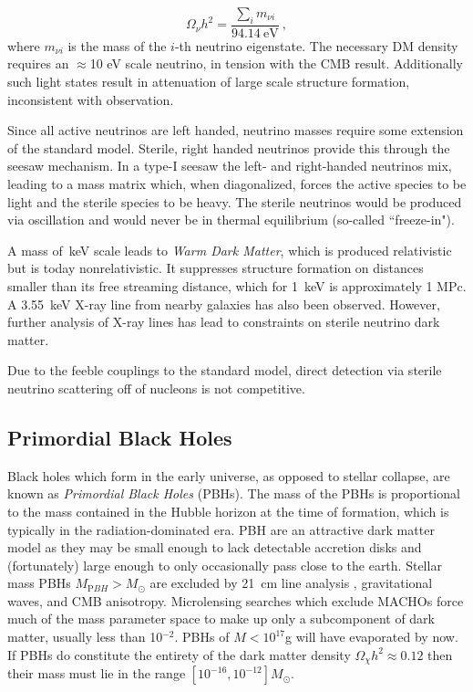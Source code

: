 \begin{equation}
    \Omega_\nu h^2 = \frac{\sum_i m_{\nu i}}{94.14 \mathrm{~eV}}~,
\end{equation}
\noindent
where $m_{\nu i}$ is the mass of the $i$-th neutrino eigenstate.
The necessary DM density requires an $\approx$10 eV scale neutrino, in tension with the CMB result\cite{planck_collaboration_planck_2020}.
Additionally such light states result in attenuation of large scale structure formation, inconsistent with observation.

Since all active neutrinos are left handed, neutrino masses require some extension of the standard model.
Sterile, right handed neutrinos provide this through the seesaw mechanism\cite{boyarsky_sterile_2019}.
In a type-I seesaw the left- and right-handed neutrinos mix, leading to a mass matrix which, when diagonalized, forces the active species to be light and the sterile species to be heavy.
The sterile neutrinos would be produced via oscillation and would never be in thermal equilibrium (so-called ``freeze-in").

A mass of~keV scale leads to \textit{Warm Dark Matter}, which is produced relativistic but is today nonrelativistic.
It suppresses structure formation on distances smaller than its free streaming distance, which for 1~keV is approximately 1 MPc.
A 3.55~keV X-ray line from nearby galaxies has also been observed\cite{bulbul_detection_2014}.
However, further analysis of X-ray lines has lead to constraints on sterile neutrino dark matter\cite{dasgupta_sterile_2021}.

Due to the feeble couplings to the standard model, direct detection via sterile neutrino scattering off of nucleons is not competitive.

\subsection{Primordial Black Holes}

Black holes which form in the early universe, as opposed to stellar collapse, are known as \textit{Primordial Black Holes} (PBHs).
The mass of the PBHs is proportional to the mass contained in the Hubble horizon at the time of formation\cite{villanueva-domingo_brief_2021}, which is typically in the radiation-dominated era.
PBH are an attractive dark matter model as they may be small enough to lack detectable accretion disks and (fortunately) large enough to only occasionally pass close to the earth.
Stellar mass PBHs $M_{ \mathrm PBH} > M_\odot$ are excluded by 21~cm line analysis \cite{villanueva-domingo_21_2021}, gravitational waves, and CMB anisotropy.
Microlensing searches which exclude MACHOs\cite{hawkins_new_2015} force much of the mass parameter space to make up only a subcomponent of dark matter, usually less than 10$^{-2}$.
PBHs of $M<10^{17}$g will have evaporated by now.
If PBHs do constitute the entirety of the dark matter density $\Omega_\chi h^2\approx 0.12$ then their mass must lie in the range $[10^{-16}, 10^{-12}]M_\odot$\cite{villanueva-domingo_brief_2021}.

